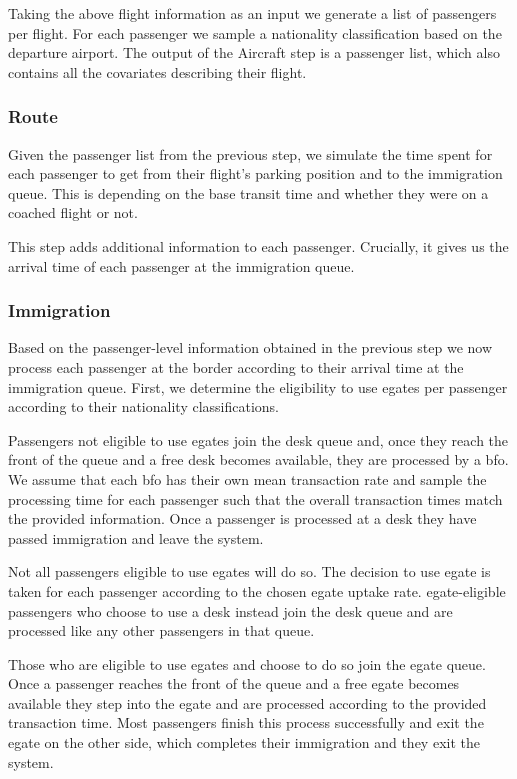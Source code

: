 \documentclass[10pt]{article}
\begin{document}
Taking the above flight information as an input we generate a list of passengers per flight. For each passenger we sample a nationality classification based on the departure airport. The output of the Aircraft step is a passenger list, which also contains all the covariates describing their flight.

\subsubsection{Route}

Given the passenger list from the previous step, we simulate the time spent for each passenger to get from their flight's parking position and to the immigration queue. This is depending on the base transit time and whether they were on a coached flight or not.

This step adds additional information to each passenger. Crucially, it gives us the arrival time of each passenger at the immigration queue. 

\subsubsection{Immigration}

Based on the passenger-level information obtained in the previous step we now process each passenger at the border according to their arrival time at the immigration queue. First, we determine the eligibility to use \glspl{egate} per passenger according to their nationality classifications. 

Passengers not eligible to use \glspl{egate} join the desk queue and, once they reach the front of the queue and a free desk becomes available, they are processed by a \gls{bfo}. We assume that each \gls{bfo} has their own mean transaction rate and sample the processing time for each passenger such that the overall transaction times match the provided information. Once a passenger is processed at a desk they have passed immigration and leave the system.

Not all passengers eligible to use \glspl{egate} will do so. The decision to use \gls{egate} is taken for each passenger according to the chosen \gls{egate} uptake rate. \gls{egate}-eligible passengers who choose to use a desk instead join the desk queue and are processed like any other passengers in that queue. 

Those who are eligible to use \glspl{egate} and choose to do so join the \gls{egate} queue. Once a passenger reaches the front of the queue and a free \gls{egate} becomes available they step into the \gls{egate} and are processed according to the provided transaction time. Most passengers finish this process successfully and exit the \gls{egate} on the other side, which completes their immigration and they exit the system.
\end{document}

